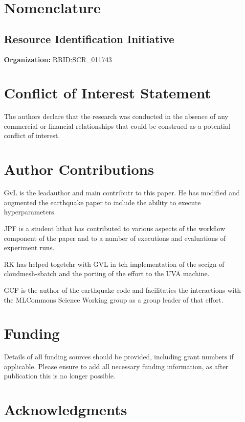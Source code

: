 \documentclass[utf8]{frontiersSCNS}
\begin{document}
\section{Nomenclature}

\subsection{Resource Identification Initiative}

{\bf Organization:} RRID:SCR_011743

\section*{Conflict of Interest Statement}

The authors declare that the research was conducted in the absence of
any commercial or financial relationships that could be construed as a
potential conflict of interest.

\section*{Author Contributions}

GvL is the leadauthor and main contributr to this paper. He has
modified and augmented the earthquake paper to include the ability to
execute hyperparameters. 

JPF is a student hthat has contributed to various aspects of the
workflow component of the paper and to a number of executions and
evaluations of experiment runs.

RK has helped togetehr with GVL in teh implementation of the secign of
cloudmesh-sbatch and the porting of the effort to the UVA machine.

GCF is the author of the earthquake code and facilitaties the
interactions with the MLCommons Science Working group as a group
leader of that effort.

\section*{Funding}

Details of all funding sources should be provided, including grant numbers if applicable. Please ensure to add all necessary funding information, as after publication this is no longer possible.

\section*{Acknowledgments}
\end{document}
